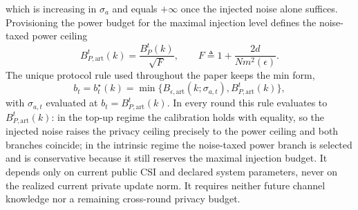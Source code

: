 \documentclass[journal]{IEEEtran}
\begin{document}
which is increasing in $\sigma_a$ and equals $+\infty$ once the injected noise alone suffices. Provisioning the power budget for the maximal injection level defines the noise-taxed power ceiling
\begin{equation}
 B_{P,\mathrm{art}}^t(k)=\frac{B_P^t(k)}{\sqrt F},
 \qquad F\triangleq1+\frac{2d}{Nm^2(\epsilon)}.
\end{equation}
The unique protocol rule used throughout the paper keeps the min form,
\begin{equation}
 b_t=b_t^\star(k)=\min\{B_{\epsilon,\mathrm{art}}(k;\sigma_{a,t}),B_{P,\mathrm{art}}^t(k)\},
 \label{eqn:bstar_round}
\end{equation}
with $\sigma_{a,t}$ evaluated at $b_t=B_{P,\mathrm{art}}^t(k)$. In every round this rule evaluates to $B_{P,\mathrm{art}}^t(k)$: in the top-up regime the calibration holds with equality, so the injected noise raises the privacy ceiling precisely to the power ceiling and both branches coincide; in the intrinsic regime the noise-taxed power branch is selected and is conservative because it still reserves the maximal injection budget. It depends only on current public CSI and declared system parameters, never on the realized current private update norm. It requires neither future channel knowledge nor a remaining cross-round privacy budget.
\end{document}
